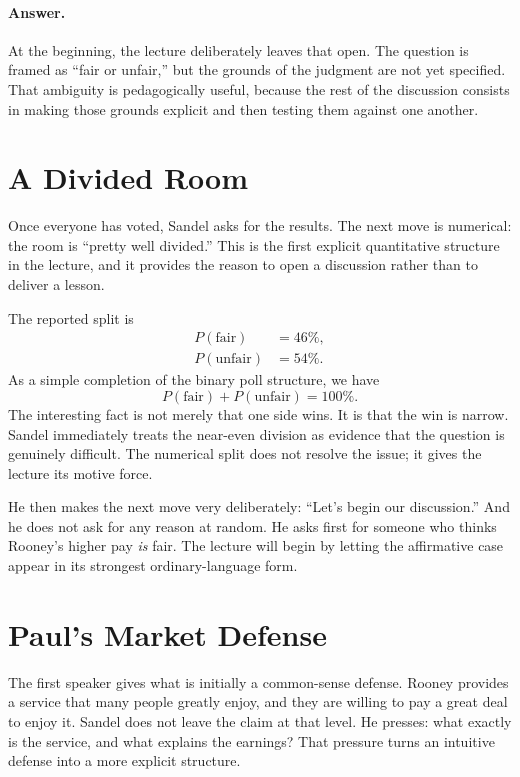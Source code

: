 \paragraph{Answer.} At the beginning, the lecture deliberately leaves that open. The question is framed as ``fair or unfair,'' but the grounds of the judgment are not yet specified. That ambiguity is pedagogically useful, because the rest of the discussion consists in making those grounds explicit and then testing them against one another.

\section{A Divided Room}

Once everyone has voted, Sandel asks for the results. The next move is numerical: the room is ``pretty well divided.'' This is the first explicit quantitative structure in the lecture, and it provides the reason to open a discussion rather than to deliver a lesson.

The reported split is
\begin{align}
P(\text{fair}) &= 46\%,\\
P(\text{unfair}) &= 54\%.
\end{align}
As a simple completion of the binary poll structure, we have
\begin{equation}
P(\text{fair}) + P(\text{unfair}) = 100\%.
\end{equation}
The interesting fact is not merely that one side wins. It is that the win is narrow. Sandel immediately treats the near-even division as evidence that the question is genuinely difficult. The numerical split does not resolve the issue; it gives the lecture its motive force.

He then makes the next move very deliberately: ``Let's begin our discussion.'' And he does not ask for any reason at random. He asks first for someone who thinks Rooney's higher pay \emph{is} fair. The lecture will begin by letting the affirmative case appear in its strongest ordinary-language form.

\section{Paul's Market Defense}

The first speaker gives what is initially a common-sense defense. Rooney provides a service that many people greatly enjoy, and they are willing to pay a great deal to enjoy it. Sandel does not leave the claim at that level. He presses: what exactly is the service, and what explains the earnings? That pressure turns an intuitive defense into a more explicit structure.


